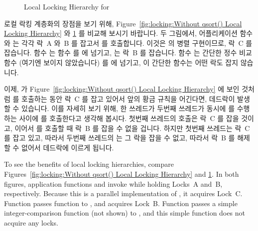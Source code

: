 \begin{figure}[tbp]
\centering
{}
\caption{Local Locking Hierarchy for }
\label{fig:locking:Local Locking Hierarchy for qsort()}
\end{figure}

로컬 락킹 계층화의 장점을 보기 위해,
Figure~\ref{fig:locking:Without qsort() Local Locking Hierarchy} 와
\ref{fig:locking:Local Locking Hierarchy for qsort()}
를 비교해 보시기 바랍니다.
두 그림에서, 어플리케이션 함수  와  는 각각 락~A 와~B 를
잡고서  를 호출합니다.
이것은  의 병렬 구현이므로, 락~C 를 잡습니다.
함수  는 함수  를  에 넘기고,  는
락~B 를 잡습니다.
함수  는 간단한 정수 비교 함수 (여기엔 보이지 않았습니다) 를
 에 넘기고, 이 간단한 함수는 어떤 락도 잡지 않습니다.

이제,  가
Figure~\ref{fig:locking:Without qsort() Local Locking Hierarchy} 에 보인 것처럼
 를 호출하는 동안 락~C 를 잡고 있어서 앞의 황금 규칙을 어긴다면,
데드락이 발생할 수 있습니다.
이를 자세히 보기 위해, 한 쓰레드가 두번째 쓰레드가 동시에  를
수행하는 사이에  를 호출한다고 생각해 봅시다.
첫번째 쓰레드의  호출은 락~C 를 잡을 것이고, 이어서  를
호출할 때 락~B 를 잡을 수 없을 겁니다.
하지만 첫번째 쓰레드는 락~C 를 잡고 있고, 따라서 두번째 쓰레드의 
는 그 락을 잡을 수 없고, 따라서 락~B 를 해제할 수 없어서 데드락에 이르게
됩니다.

\iffalse

To see the benefits of local locking hierarchies, compare
Figures~\ref{fig:locking:Without qsort() Local Locking Hierarchy} and
\ref{fig:locking:Local Locking Hierarchy for qsort()}.
In both figures, application functions  and 
invoke  while holding Locks~A and~B, respectively.
Because this is a parallel implementation of , it acquires
Lock~C\@.
Function  passes function  to ,
and  acquires Lock~B\@.
Function  passes a simple integer-comparison function (not
shown) to , and this simple function does not acquire any
locks.

